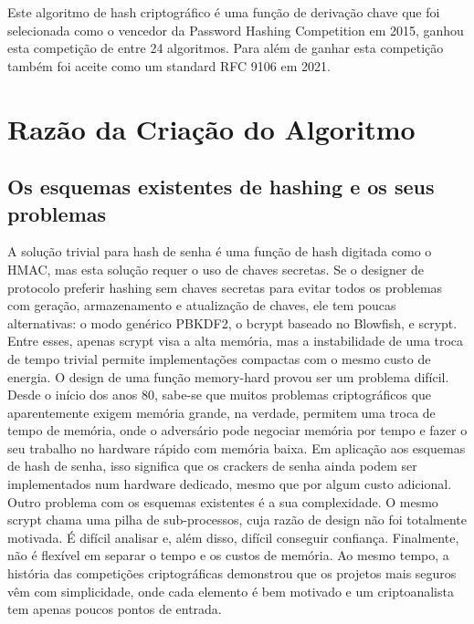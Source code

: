 \documentclass[conference]{IEEEtran}
\begin{document}
Este algoritmo de hash criptográfico é uma função de derivação chave que foi 
selecionada como o vencedor da Password Hashing Competition \cite{phc} em 2015, 
ganhou esta competição de entre 24 algoritmos. Para além de ganhar esta 
competição também foi aceite como um standard RFC 9106 \cite{rfc9106} em 2021.


\section{Razão da Criação do Algoritmo}

\subsection{Os esquemas existentes de hashing e os seus problemas}

A solução trivial para hash de senha é uma função de hash digitada como o HMAC, 
mas esta solução requer o uso de chaves secretas. Se o designer de protocolo 
preferir hashing sem chaves secretas para evitar todos os problemas com geração, 
armazenamento e atualização de chaves, ele tem poucas alternativas: 
o modo genérico PBKDF2, o bcrypt baseado no Blowfish, e scrypt. Entre esses, 
apenas scrypt visa a alta memória, mas a instabilidade de uma troca de tempo 
trivial permite implementações compactas com o mesmo custo de energia. 
O design de uma função memory-hard provou ser um problema difícil. Desde o 
início dos anos 80, sabe-se que muitos problemas criptográficos que 
aparentemente exigem memória grande, na verdade, permitem uma troca de 
tempo de memória, onde o adversário pode negociar memória por tempo e 
fazer o seu trabalho no hardware rápido com memória baixa. Em aplicação aos 
esquemas de hash de senha, isso significa que os crackers de senha ainda podem 
ser implementados num hardware dedicado, mesmo que por algum custo adicional. 
Outro problema com os esquemas existentes é a sua complexidade. O mesmo scrypt 
chama uma pilha de sub-processos, cuja razão de design não foi totalmente motivada. 
É difícil analisar e, além disso, difícil conseguir confiança. Finalmente, 
não é flexível em separar o tempo e os custos de memória. Ao mesmo tempo, 
a história das competições criptográficas demonstrou que os projetos mais 
seguros vêm com simplicidade, onde cada elemento é bem motivado e um 
criptoanalista tem apenas poucos pontos de entrada. 
\end{document}
